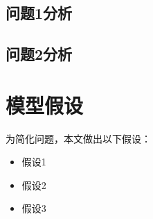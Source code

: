 \documentclass[withoutpreface,bwprint]{cumcmthesis}
\begin{document}
\subsection{问题1分析}

\subsection{问题2分析}	



\section{模型假设}

为简化问题，本文做出以下假设：

\begin{itemize}
    \item 假设1
    \item 假设2
    \item 假设3
\end{itemize}


\end{document}
